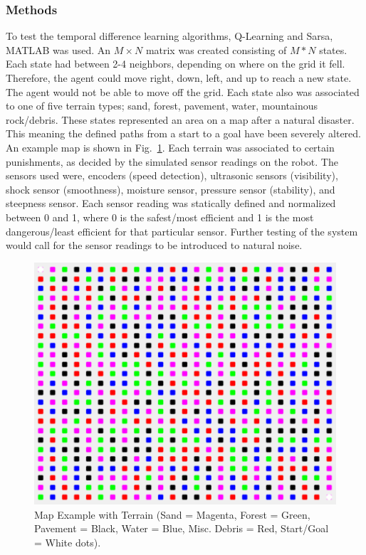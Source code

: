 \documentclass[12pt,american]{report}
\begin{document}
\subsubsection{Methods}

To test the temporal difference learning algorithms, Q-Learning and Sarsa, MATLAB was used. An $M\times N$ matrix was created consisting of $M*N$ states.  Each state had between 2-4 neighbors, depending on where on the grid it fell. Therefore, the agent could move right, down, left, and up to reach a new state. The agent would not be able to move off the grid. Each state also was associated to one of five terrain types; sand, forest, pavement, water, mountainous rock/debris.  These states represented an area on a map after a natural disaster.  This meaning the defined paths from a start to a goal have been severely altered. An example map is shown in Fig.~\ref{fig:map-example}. Each terrain was associated to certain punishments, as decided by the simulated sensor readings on the robot.  The sensors used were, encoders (speed detection), ultrasonic sensors (visibility), shock sensor (smoothness), moisture sensor, pressure sensor (stability), and steepness sensor.  Each sensor reading was statically defined and normalized between 0 and 1, where 0 is the safest/most efficient and 1 is the most dangerous/least efficient for that particular sensor. Further testing of the system would call for the sensor readings to be introduced to natural noise.

\begin{figure}
\centering
\includegraphics[scale=1.5]{images/map-example.PNG}
\caption{Map Example with Terrain (Sand = Magenta, Forest = Green, Pavement = Black, Water = Blue, Misc. Debris = Red, Start/Goal = White dots).}
\label{fig:map-example}
\end{figure}
\end{document}
